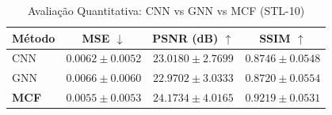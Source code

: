 \begin{table}[h]
\centering
\caption{Avaliação Quantitativa: CNN vs GNN vs MCF (STL-10)}
\label{tab:comparison_v2}
\begin{tabular}{lccc}
\hline
Método & MSE $\downarrow$ & PSNR (dB) $\uparrow$ & SSIM $\uparrow$ \\
\hline
CNN & $0.0062 \pm 0.0052$ & $23.0180 \pm 2.7699$ & $0.8746 \pm 0.0548$ \\
GNN & $0.0066 \pm 0.0060$ & $22.9702 \pm 3.0333$ & $0.8720 \pm 0.0554$ \\
\textbf{MCF} & $0.0055 \pm 0.0053$ & $24.1734 \pm 4.0165$ & $0.9219 \pm 0.0531$ \\
\hline
\end{tabular}
\end{table}